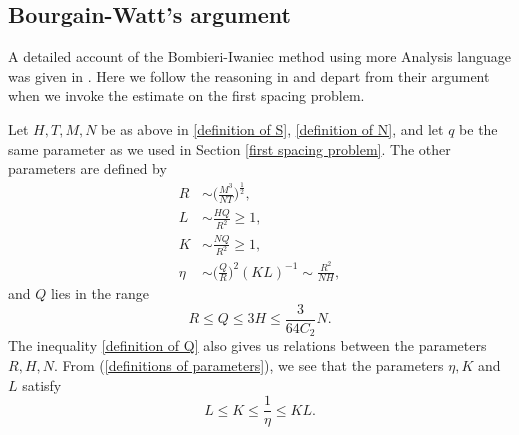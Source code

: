 \documentclass[11pt]{amsart}
\numberwithin{equation}{section}
\theoremstyle{definition}
\theoremstyle{proposition}
\begin{document}
\subsection{Bourgain-Watt's argument}
A detailed account of the Bombieri-Iwaniec method using more Analysis language was given in \cite[Sections 7-12]{BourgainWatt1st}. 
Here we follow the reasoning in \cite[Section 5]{BourgainWatt2nd} and depart from their argument when we invoke the estimate on the first spacing problem. 

Let $H,T,M,N$ be as above in \eqref{definition of S}, \eqref{definition of N}, and let $q$ be the same parameter as we used in Section \ref{first spacing problem}. The other parameters are defined by 
\begin{equation}  \label{definitions of parameters}
\begin{split}
R& \sim \Big(\frac{M^3}{NT}\Big)^{\frac{1}{2}} ,
\\ L & \sim \frac{HQ}{R^2} \ge 1 ,
\\ K & \sim \frac{NQ}{R^2} \ge 1 ,
\\ \eta & \sim \Big(\frac{Q}{R}\Big)^2 (KL)^{-1} \sim \frac{R^2}{NH},
\end{split}    
\end{equation}
and $Q$ lies in the range
\begin{equation}  \label{definition of Q}
 R \le Q\le 3H \le \frac{3}{64C_2} N.    
\end{equation}
The inequality \eqref{definition of Q} also gives us relations between the parameters $R,H,N$. From (\ref{definitions of parameters}),  we see that the parameters $\eta, K$ and $L$ satisfy 
\begin{equation}  \label{L,K,eta}
L\le K\le \frac{1}{\eta}\le KL.    
\end{equation}  \\
\end{document}
